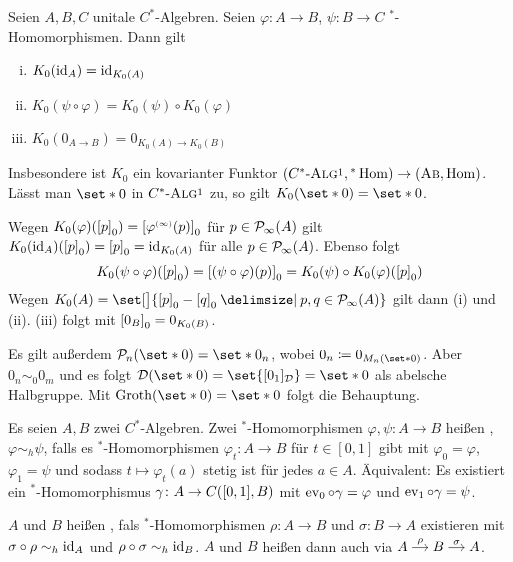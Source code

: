 \begin{proposition}[label=prop:611,{name=[{Funktorialität von K0}]}]
	Seien $A,B,C$ unitale $C^*$-Algebren.
	Seien $\varphi \colon A\to B$, $\psi \colon B \to C$  $^*$-Homomorphismen.
	Dann gilt
	\begin{enumerate}[(i)]
		\item $K_0(\id_A) = \id_{K_0(A)}$
		\item $K_0(\psi \circ \varphi) = K_0(\psi) \circ K_0(\varphi)$
		\item $K_0(0_{A \to B}) = 0_{K_0(A) \to K_0(B)}$
	\end{enumerate}
	Insbesondere ist $K_0$ ein kovarianter Funktor $(\CSTARUN, {^*\Hom}) \to \enbrace*{\AB, {\Hom}}$.
	Lässt man $\set*{0}$ in $\CSTARUN$ zu, so gilt $K_0(\set*{0}) = \set*{0}$.
\end{proposition}
\begin{beweis}
	Wegen $K_0(\varphi) \enbrace*{\benbrace*{p}_0} = \benbrace*{\varphi^\ssbrace{\infty}(p)}_0$ für $p \in \Pinfty(A)$ gilt $K_0(\id_A) \enbrace*{\benbrace*{p}_0} = \benbrace*{p}_0 =\id_{K_0(A)}$ für alle $p \in \Pinfty(A)$.
	Ebenso folgt 
	\[
		K_0(\psi \circ \varphi) \enbrace*{\benbrace*{p}_0} = \benbrace*{(\psi \circ \varphi)(p)}_0 = K_0(\psi) \circ K_0(\varphi) \enbrace*{\benbrace*{p}_0}
	\]
	Wegen $K_0(A) = \set[\big]{\benbrace*{p}_0 - \benbrace*{q}_0 \given p,q \in \Pinfty(A)}$ gilt dann (i) und (ii).
	(iii) folgt mit $\benbrace*{0_B}_0 = 0_{K_0(B)}$.
	
	Es gilt außerdem $\kernedP_n( \set*{0}) = \set*{0_n}$, wobei $0_n \coloneqq 0_{M_n(\set*{0})}$.
	Aber $0_n \sim_0 0_m$ und es folgt $\mathcal{D}(\set*{0}) = \set{\benbrace{0_1}_{\mathcal{D}}} = \set*{0}$ als abelsche Halbgruppe.
	Mit $\Groth(\set*{0}) = \set*{0}$ folgt die Behauptung.
\end{beweis}

\begin{definition}[label=def:612,{name=[{homotope *-Homomorphismen}]}]
	Es seien $A,B$ zwei $C^*$-Algebren. Zwei $^*$-Homomorphismen $\varphi,\psi \colon A \to B$ heißen , $\varphi \sim_h \psi$, falls es $^*$-Homomorphismen $\varphi_t \colon A \to B$ für $t \in [0,1]$ gibt mit $\varphi_0=\varphi$, $\varphi_1 = \psi$ und sodass $t \mapsto \varphi_t(a)$ stetig ist für jedes $a \in A$.
	Äquivalent: Es existiert ein $^*$-Homomorphismus $\gamma \colon A \to C \enbrace*{[0,1],B}$ mit $\ev_0 \circ \gamma = \varphi$ und $\ev_1 \circ \gamma = \psi$.
	
	$A$ und $B$ heißen , fals $^*$-Homomorphismen $\rho \colon A \to B$ und $\sigma \colon B \to A$ existieren mit $\sigma \circ \rho \sim_h \id_A$ und $\rho \circ \sigma \sim_h \id_B$.
	$A$ und $B$ heißen dann auch  via $\begin{tikzcd}[cramped,sep=small] A \rar["\rho"] & B \rar["\sigma"] & A \end{tikzcd}$.
\end{definition}

